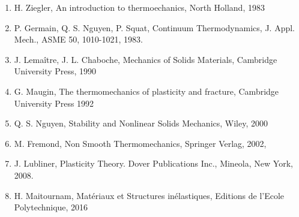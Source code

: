 \begin{enumerate}
\item 
H. Ziegler, An introduction to thermoechanics, North Holland, 1983
\item P. Germain, Q. S. Nguyen, P. Squat, Continuum Thermodynamics, J. Appl. Mech., ASME 50, 1010-1021, 1983.
\item J. Lemaître, J. L. Chaboche, Mechanics of Solids Materials, Cambridge University Press, 1990
\item G. Maugin, The thermomechanics of plasticity and fracture, Cambridge University Press 1992
\item Q. S. Nguyen, Stability and Nonlinear Solids Mechanics, Wiley, 2000 
\item M. Fremond, Non Smooth Thermomechanics, Springer Verlag, 2002,
\item J. Lubliner, Plasticity Theory. Dover Publications Inc., Mineola, New York, 2008.
\item H. Maitournam, Matériaux et Structures inélastiques, Editions de l’Ecole Polytechnique, 2016 
\end{enumerate}